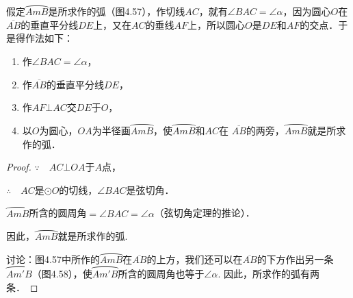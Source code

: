   \begin{analyze}
  假定$\wideparen{AmB}$是所求作的弧（图4.57），作切线${AC}$，就有$\angle BAC=\angle \alpha$，因为圆心$O$在$\overline{AB}$的垂直平分线$DE$上，又在$AC$的垂线$AF$上，所以圆心$O$是$DE$和$AF$的交点．于是得作法如下：
  \begin{enumerate}
    \item 作$\angle BAC=\angle \alpha$，
    \item 作$\overline{AB}$的垂直平分线$DE$，
    \item 作$AF\bot AC$交$DE$于$O$，
    \item 以$O$为圆心，$OA$为半径画$\wideparen{AmB}$，使$\wideparen{AmB}$和$AC$在
    $\overline{AB}$的两旁，$\wideparen{AmB}$就是所求作的弧．
  \end{enumerate}
  \end{analyze}
  
  \begin{proof}
  $\because\quad AC\bot OA$于$A$点，
  
  $\therefore\quad AC$是$\odot O$的切线，$\angle BAC$是弦切角．
  
  $\wideparen{AmB}$所含的圆周角$=\angle BAC=\angle \alpha$（弦切角定理的推论）．
  
  因此，$\wideparen{AmB}$就是所求作的弧.
  
  讨论：图4.57中所作的$\wideparen{AmB}$在$\overline{AB}$的上方，我们还可以在$\overline{AB}$的下方作出另一条$\wideparen{Am'B}$（图4.58），使$\wideparen{Am'B}$所含的圆周角也等于$\angle \alpha$. 因此，所求作的弧有两条．
  \end{proof}
  
